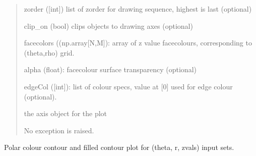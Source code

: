 \documentclass[a4paper,10pt,english]{sphinxmanual}
\begin{document}
\begin{fulllineitems}
\begin{fulllineitems}
\begin{quote}
\begin{description}
\begin{DUlineblock}{0em}
\item[] zorder ({[}int{]}) list of zorder for drawing sequence, highest is last (optional)
\item[] clip\_on (bool) clips objects to drawing axes (optional)
\item[] facecolors ((np.array{[}N,M{]}): array of z value facecolours, corresponding to (theta,rho) grid.
\item[] alpha (float): facecolour surface transparency (optional)
\item[] edgeCol ({[}int{]}): list of colour specs, value at {[}0{]} used for edge colour (optional).            
\end{DUlineblock}

\item[{Returns:}] \leavevmode
\begin{DUlineblock}{0em}
\item[] the axis object for the plot
\end{DUlineblock}

\item[{Raises:}] \leavevmode
\begin{DUlineblock}{0em}
\item[] No exception is raised.
\end{DUlineblock}

\end{description}
\end{quote}

\end{fulllineitems}


\begin{fulllineitems}
\label{ryplot:pyradi.ryplot.Plotter.polarMesh}
Polar colour contour and filled contour plot for (theta, r, zvals) input sets.


\end{fulllineitems}
\end{fulllineitems}
\end{document}
